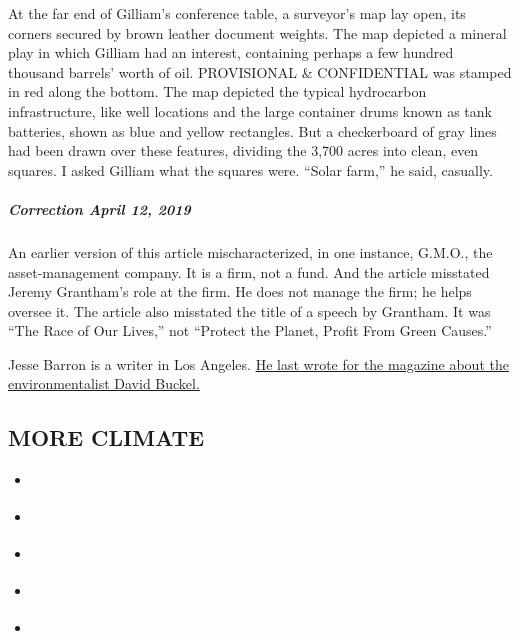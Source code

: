 At the far end of Gilliam's conference table, a surveyor's map lay open,
its corners secured by brown leather document weights. The map depicted
a mineral play in which Gilliam had an interest, containing perhaps a
few hundred thousand barrels' worth of oil. PROVISIONAL \& CONFIDENTIAL
was stamped in red along the bottom. The map depicted the typical
hydrocarbon infrastructure, like well locations and the large container
drums known as tank batteries, shown as blue and yellow rectangles. But
a checkerboard of gray lines had been drawn over these features,
dividing the 3,700 acres into clean, even squares. I asked Gilliam what
the squares were. ``Solar farm,'' he said, casually.

\hypertarget{correction-april-12-2019}{%
\subparagraph{\texorpdfstring{\textbf{Correction} April 12,
2019}{Correction April 12, 2019}}\label{correction-april-12-2019}}

An earlier version of this article mischaracterized, in one instance,
G.M.O., the asset-management company. It is a firm, not a fund. And the
article misstated Jeremy Grantham's role at the firm. He does not manage
the firm; he helps oversee it. The article also misstated the title of a
speech by Grantham. It was ``The Race of Our Lives,'' not ``Protect the
Planet, Profit From Green Causes.''

Jesse Barron is a writer in Los Angeles.
\href{https://www.nytimes3xbfgragh.onion/interactive/2018/12/27/magazine/lives-they-lived-david-buckel.html}{He
last wrote for the magazine about the environmentalist David Buckel.}

\hypertarget{more-climate}{%
\subsection{MORE CLIMATE}\label{more-climate}}

\begin{itemize}
\tightlist
\item
  \href{https://www.nytimes3xbfgragh.onion/interactive/2019/04/11/magazine/climate-change-bangladesh-scavenging.html}{}
\item
  \href{https://www.nytimes3xbfgragh.onion/interactive/2019/04/10/magazine/climate-change-pinkertons.html}{}
\item
  \href{https://www.nytimes3xbfgragh.onion/interactive/2019/04/09/magazine/climate-change-capitalism.html}{}
\item
  \href{https://www.nytimes3xbfgragh.onion/interactive/2019/04/09/magazine/climate-change-politics-economics.html}{}
\item
  \href{https://www.nytimes3xbfgragh.onion/interactive/2019/04/09/magazine/climate-change-peru-law.html}{}
\end{itemize}

